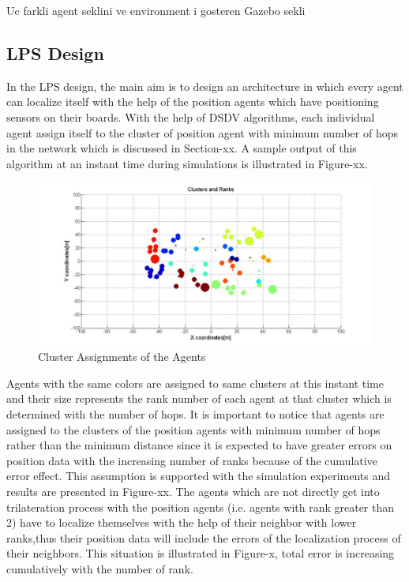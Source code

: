 \documentclass[twoside]{article}
\begin{document}
    Uc farkli agent seklini ve environment i gosteren Gazebo sekli 

	
	\subsection{LPS  Design}
In the LPS design, the main aim is to design an architecture in which every agent can localize itself with the help of the position agents which have positioning sensors on their boards. With the help of DSDV algorithms, each individual agent assign itself to the cluster of position agent with minimum number of hops in the network which is discussed in Section-xx. A sample output of this algorithm at an instant time during simulations is illustrated in Figure-xx. 
	
		\begin{figure}[H]
			\caption{Cluster Assignments of the Agents}
		\centerline{\includegraphics[scale = 0.4]{Clusters_Ranks_1}}
			\end{figure} 
	Agents with the same colors are assigned to same clusters at this instant time and their size represents the rank number of each agent at that cluster which is determined with the number of hops. It is important to notice that agents are assigned to the clusters of the position agents with minimum number of hops rather than the minimum distance since it is expected to have greater errors on position data with the increasing number of ranks because of the cumulative error effect. This assumption is supported with the simulation experiments and results are presented in Figure-xx. 
The agents which are not directly get into trilateration process with the position agents (i.e. agents with rank greater than 2) have to localize themselves with the help of their neighbor with lower ranks,thus their position data will include the errors of the localization process of their neighbors. This situation is illustrated in Figure-x, total error is increasing cumulatively with the number of rank. 
	
\end{document}
